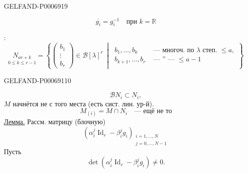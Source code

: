 \begin{GelfandAdjacentEvidence}{GELFAND-P000691}{9}

\[
\overline{g_i}=g_i^{-1}\quad\text{при }k=\mathbb R
\]

:
\[
\underset{0\leq k\leq r-1}{N_{ar+k}}
=\left\{
\begin{pmatrix}b_1\\\vdots\\b_r\end{pmatrix}\in\mathcal B[\lambda]^r
\ \middle|\
\begin{aligned}
b_1,\ldots,b_k&\text{ --- многоч. по }\lambda\text{ степ. }\leq a,\\
b_{k+1},\ldots,b_r&\text{ --- '' --- }\leq a-1
\end{aligned}\right\}
\]
\end{GelfandAdjacentEvidence}
\begin{GelfandAdjacentEvidence}{GELFAND-P000691}{10}

\end{GelfandAdjacentEvidence}

\[
\mathcal B N_i\subset N_i,
\]
\(M\) начнётся не с того места (есть сист. лин. ур-й).
\[
M_{(i)}=M\cap N_i\quad\text{--- ещё не то}
\]
\underline{Лемма.} Рассм. матрицу (блочную)
\[
(\alpha_i^j\operatorname{Id}_r-\beta_i^j g_i)_{
\substack{i=1,\ldots,N\\j=0,\ldots,N-1}}
\]
Пусть
\[
\det(\alpha_i^j\operatorname{Id}_r-\beta_i^j g_i)\ne0.
\]


